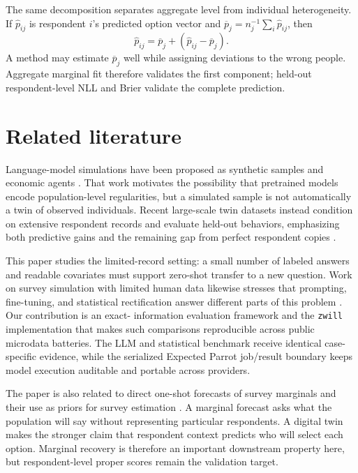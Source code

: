 \documentclass[11pt]{article}
\newcommand{\zwill}{\texttt{zwill}}
\begin{document}
The same decomposition separates aggregate level from individual
heterogeneity. If $\widehat p_{ij}$ is respondent $i$'s predicted option vector
and $\overline p_j=n_j^{-1}\sum_i\widehat p_{ij}$, then
\[
 \widehat p_{ij}=\overline p_j+
 (\widehat p_{ij}-\overline p_j).
\]
A method may estimate $\overline p_j$ well while assigning deviations to the
wrong people. Aggregate marginal fit therefore validates the first component;
held-out respondent-level NLL and Brier validate the complete prediction.

\section{Related literature}
Language-model simulations have been proposed as synthetic samples and
economic agents \citep{argyle2023out,horton2023homo}. That work motivates the
possibility that pretrained models encode population-level regularities, but a
simulated sample is not automatically a twin of observed individuals. Recent
large-scale twin datasets instead condition on extensive respondent records
and evaluate held-out behaviors, emphasizing both predictive gains and the
remaining gap from perfect respondent copies \citep{toubia2025twin}.

This paper studies the limited-record setting: a small number of labeled
answers and readable covariates must support zero-shot transfer to a new
question. Work on survey simulation with limited human data likewise stresses
that prompting, fine-tuning, and statistical rectification answer different
parts of this problem \citep{krsteski2025valid}. Our contribution is an exact-
information evaluation framework and the \zwill{} implementation that makes such
comparisons reproducible across public microdata batteries. The LLM and
statistical benchmark receive identical case-specific evidence, while the
serialized Expected Parrot job/result boundary keeps model execution auditable
and portable across providers.

The paper is also related to direct one-shot forecasts of survey marginals and
their use as priors for survey estimation
\citep{horton2026marginalpredictors,horton2026surveypriors}. A marginal forecast
asks what the population will say without representing particular respondents.
A digital twin makes the stronger claim that respondent context predicts who
will select each option. Marginal recovery is therefore an important downstream
property here, but respondent-level proper scores remain the validation target.
\end{document}
